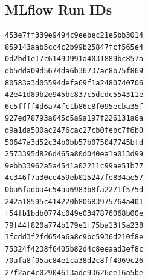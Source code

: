 \documentclass[12pt,a4paper]{article}
\begin{document}
\subsection*{MLflow Run IDs}

\begin{lstlisting}
453e7ff339e9494c9eebec21e5bb3014
859143aab5cc4c2b99b25847fcf565e4
0d2bd1e17c61493991a4031889bc857a
db5dda09d5674da6b36737ac8b75f869
80583a3d05594defa69f1a2480740706
42e41d89b2e945bc837c5dcdc554311e
6c5ffff4d6a74fc1b86c8f095ecba35f
927ed78793a045c5a9a197f226131a6a
d9a1da500ac2476cac27cb0febc7f6b0
50647a3d52c34b0bb57b075047745bfd
2573395d826d465a80d040ea1a013d99
9ebb33962a5a4541a02211c99ae51b77
4c346f7a30ce459eb015247fe834ae57
0ba6fadba4c54aa6983b8fa2271f575d
242a18595c414220b80683975764a401
f54fb1bdb0774c049e0347876068b00e
79f44f820a774b179e1f75ba13f5a238
1fcdd3f2fd654a6a8c9bc5936d210f8e
75324f4238f6405b82d4c8eeaad3ef8c
70afa8f05ac84e1ca38d2c8ff4969c26
27f2ae4c02904613ade93626ee16a5be
\end{lstlisting}
\end{document}
